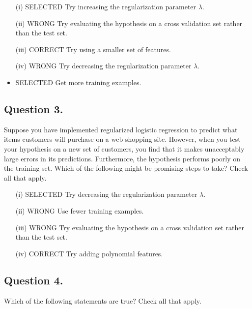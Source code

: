 \documentclass[11pt]{article} %
\begin{document}
\begin{itemize}
\item[(i)] 
SELECTED Try increasing the regularization parameter $\lambda$.
\item[(ii)] 
WRONG Try evaluating the hypothesis on a cross validation set rather than the test set.
\item[(iii)] 
CORRECT Try using a smaller set of features.
\item[(iv)] WRONG
Try decreasing the regularization parameter $\lambda$.
\item 
SELECTED Get more training examples.


\end{itemize}
\subsection*{Question 3. }
Suppose you have implemented regularized logistic regression to predict what items customers will purchase on a web shopping site. However, when you test your hypothesis on a new set of customers, you find that it makes unacceptably large errors in its predictions. Furthermore, the hypothesis performs poorly on the training set. Which of the following might be promising steps to take? Check all that apply.

\begin{itemize}
\item[(i)] SELECTED Try decreasing the regularization parameter $\lambda$.

\item[(ii)] WRONG Use fewer training examples.

\item[(iii)] WRONG Try evaluating the hypothesis on a cross validation set rather than the test set.

\item[(iv)] CORRECT Try adding polynomial features.
\end{itemize}
\subsection*{Question 4. }
Which of the following statements are true? Check all that apply.
\end{document}
